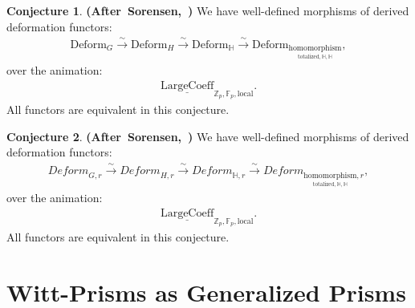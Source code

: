 \documentclass[12pt]{article}
\theoremstyle{definition}
\newtheorem{conjecture}{Conjecture}
\begin{document}
\begin{conjecture}\mbox{\textbf{(After Sorensen, \cite[Theorem 1.1]{So1})}}
We have well-defined morphisms of derived deformation functors:
\begin{align}
\mathrm{Deform}_{G}\overset{\sim}{\rightarrow}\mathrm{Deform}_H\overset{\sim}{\rightarrow} \mathrm{Deform}_\mathbb{H}\overset{\sim}{\rightarrow} \mathrm{Deform}_{\underset{{\mathrm{totalized},\mathbb{H},\mathbb{H}}}{\mathrm{homomorphism}}},
\end{align}
over the animation:
\begin{align}
\underline{\mathrm{LargeCoeff}}_{\mathbb{Z}_p,\mathbb{F}_p,\mathrm{local}}.
\end{align}
All functors are equivalent in this conjecture.
\end{conjecture}

\begin{conjecture}\mbox{\textbf{(After Sorensen, \cite[Theorem 1.1]{So1})}}
We have well-defined morphisms of derived deformation functors:
\begin{align}
\textit{Deform}_{G,r}\overset{\sim}{\rightarrow} \textit{Deform}_{H,r}\overset{\sim}{\rightarrow} \textit{Deform}_{\mathbb{H},r}\overset{\sim}{\rightarrow} \textit{Deform}_{\underset{{\mathrm{totalized},\mathbb{H},\mathbb{H}}}{\mathrm{homomorphism}},r},
\end{align}
over the animation:
\begin{align}
\underline{\mathrm{LargeCoeff}}_{\mathbb{Z}_p,\mathbb{F}_p,\mathrm{local}}.
\end{align}
All functors are equivalent in this conjecture.
\end{conjecture}

\newpage
\section{Witt-Prisms as Generalized Prisms}\label{section5}
\end{document}
